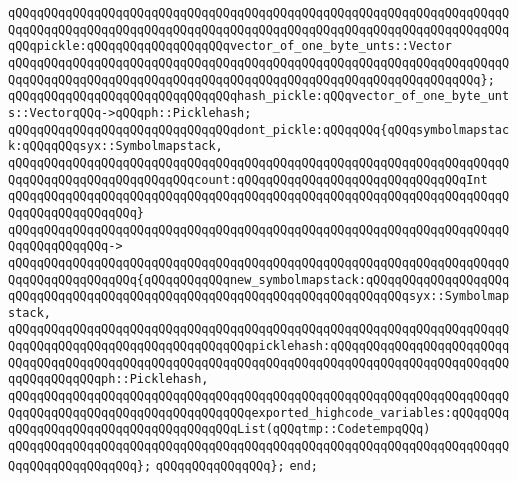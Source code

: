 \verb|qQQqqQQqqQQqqQQqqQQqqQQqqQQqqQQqqQQqqQQqqQQqqQQqqQQqqQQqqQQqqQQqqQQqqQQqqQQqqQQqqQQqqQQqqQQqqQQqqQQqqQQqqQQqqQQqqQQqqQQqqQQqqQQqqQQqqQQqqQQqqQQqpickle:qQQqqQQqqQQqqQQqqQQqvector_of_one_byte_unts::Vector|\newline
\verb|qQQqqQQqqQQqqQQqqQQqqQQqqQQqqQQqqQQqqQQqqQQqqQQqqQQqqQQqqQQqqQQqqQQqqQQqqQQqqQQqqQQqqQQqqQQqqQQqqQQqqQQqqQQqqQQqqQQqqQQqqQQqqQQqqQQqqQQq};|\newline
\newline
\verb|qQQqqQQqqQQqqQQqqQQqqQQqqQQqqQQqhash_pickle:qQQqvector_of_one_byte_unts::VectorqQQq->qQQqph::Picklehash;|\newline
\newline
\verb|qQQqqQQqqQQqqQQqqQQqqQQqqQQqqQQqdont_pickle:qQQqqQQq{qQQqsymbolmapstack:qQQqqQQqsyx::Symbolmapstack,|\newline
\verb|qQQqqQQqqQQqqQQqqQQqqQQqqQQqqQQqqQQqqQQqqQQqqQQqqQQqqQQqqQQqqQQqqQQqqQQqqQQqqQQqqQQqqQQqqQQqqQQqcount:qQQqqQQqqQQqqQQqqQQqqQQqqQQqqQQqInt|\newline
\verb|qQQqqQQqqQQqqQQqqQQqqQQqqQQqqQQqqQQqqQQqqQQqqQQqqQQqqQQqqQQqqQQqqQQqqQQqqQQqqQQqqQQqqQQq}|\newline
\verb|qQQqqQQqqQQqqQQqqQQqqQQqqQQqqQQqqQQqqQQqqQQqqQQqqQQqqQQqqQQqqQQqqQQqqQQqqQQqqQQqqQQq->|\newline
\verb|qQQqqQQqqQQqqQQqqQQqqQQqqQQqqQQqqQQqqQQqqQQqqQQqqQQqqQQqqQQqqQQqqQQqqQQqqQQqqQQqqQQqqQQq{qQQqqQQqqQQqnew_symbolmapstack:qQQqqQQqqQQqqQQqqQQqqQQqqQQqqQQqqQQqqQQqqQQqqQQqqQQqqQQqqQQqqQQqqQQqqQQqqQQqsyx::Symbolmapstack,|\newline
\verb|qQQqqQQqqQQqqQQqqQQqqQQqqQQqqQQqqQQqqQQqqQQqqQQqqQQqqQQqqQQqqQQqqQQqqQQqqQQqqQQqqQQqqQQqqQQqqQQqqQQqqQQqpicklehash:qQQqqQQqqQQqqQQqqQQqqQQqqQQqqQQqqQQqqQQqqQQqqQQqqQQqqQQqqQQqqQQqqQQqqQQqqQQqqQQqqQQqqQQqqQQqqQQqqQQqqQQqqQQqph::Picklehash,|\newline
\verb|qQQqqQQqqQQqqQQqqQQqqQQqqQQqqQQqqQQqqQQqqQQqqQQqqQQqqQQqqQQqqQQqqQQqqQQqqQQqqQQqqQQqqQQqqQQqqQQqqQQqqQQqexported_highcode_variables:qQQqqQQqqQQqqQQqqQQqqQQqqQQqqQQqqQQqqQQqList(qQQqtmp::CodetempqQQq)|\newline
\verb|qQQqqQQqqQQqqQQqqQQqqQQqqQQqqQQqqQQqqQQqqQQqqQQqqQQqqQQqqQQqqQQqqQQqqQQqqQQqqQQqqQQqqQQq};|\newline
\verb|qQQqqQQqqQQqqQQq};|\newline
\verb|end;|\newline
\newline
\newline
\newline
\newline
\newline
\newline

